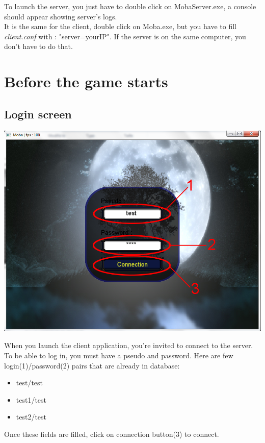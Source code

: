 \documentclass{scrreprt}
\begin{document}
		  To launch the server, you just have to double click on MobaServer.exe, a console should appear showing server's logs.\\
		  It is the same for the client, double click on Moba.exe, but you have to fill \emph{client.conf} with : "server=yourIP". If the server is on the same computer, you don't have to do that.

		  \chapter{Before the game starts}
		  \section{Login screen}
		  \begin{center}
		  \includegraphics[scale=0.4]{connection_screen.png}
		  \end{center}
		  When you launch the client application, you're invited to connect to the server. To be able to log in, you must have a pseudo and password. Here are few login(1)/password(2) pairs that are already in database:
		  \begin{itemize}
		  \item{test/test}
		  \item{test1/test}
		  \item{test2/test}
		  \end{itemize}

		  Once these fields are filled, click on connection button(3) to connect.
		  
\end{document}
